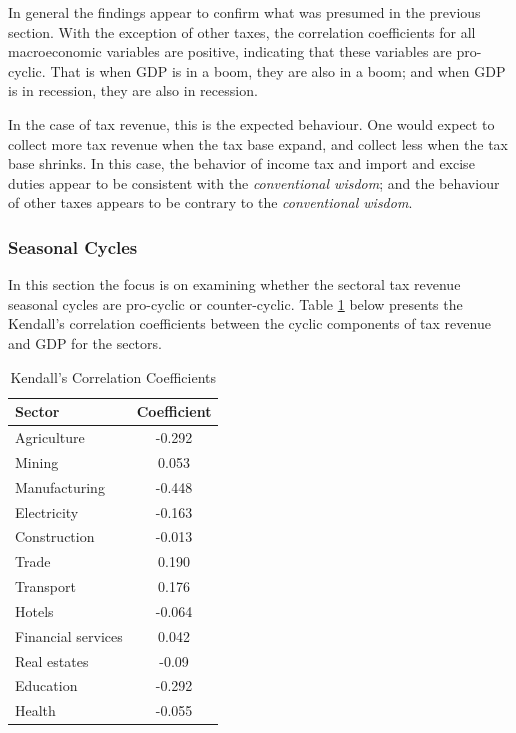 \documentclass[12pt,a4paper,final]{article}
\begin{document}
In general the findings appear to confirm what was presumed in the previous section. With the exception of other taxes, the correlation coefficients for all macroeconomic variables are positive, indicating that these variables are pro-cyclic. That is when GDP is in a boom, they are also in a boom; and when GDP is in recession, they are also in recession. 

In the case of tax revenue, this is the expected behaviour. One would expect to collect more tax revenue when the tax base expand, and collect less when the tax base shrinks. In this case, the behavior of income tax and import and excise duties appear to be consistent with the \textit{conventional wisdom}; and the behaviour of other taxes appears to be contrary to the \textit{conventional wisdom}.

\subsubsection{Seasonal Cycles}

In this section the focus is on examining  whether the sectoral tax revenue seasonal cycles are pro-cyclic or counter-cyclic. Table \ref{tab3} below presents  the Kendall's correlation coefficients between the cyclic components of tax revenue and GDP for the sectors.

\begin{table}[h]
\centering
\begin{small} 
\caption{Kendall's Correlation Coefficients} 
\label{tab3}
\begin{tabular}{l c}
\toprule
\multicolumn{1}{l}{\textbf{Sector}} & \textbf{Coefficient}\\ 
 \midrule
Agriculture & -0.292 \\
Mining & 0.053 \\
Manufacturing & -0.448\\
Electricity  & -0.163\\
Construction & -0.013 \\
Trade & 0.190\\
Transport & 0.176\\
Hotels & -0.064\\
Financial services & 0.042\\
Real estates & -0.09\\
Education & -0.292\\
Health & -0.055\\
\bottomrule
\end{tabular}
\end{small}
\end{table}
\end{document}
